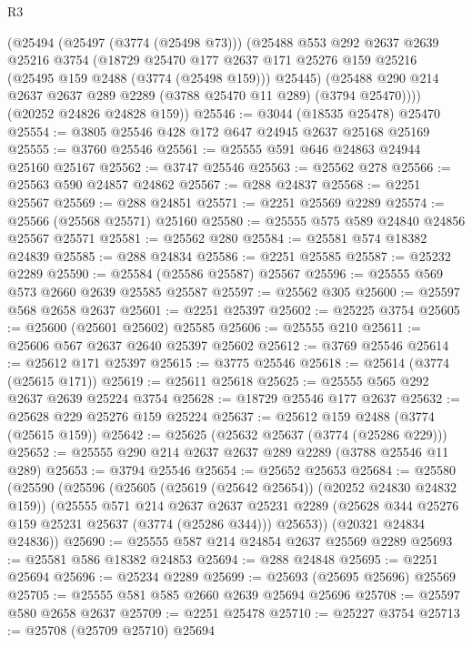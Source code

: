 \begin{lexlean}{R3}
\begin{coremodule}
      (@25494
        (@25497 (@3774 (@25498 @73)))
        (@25488
          @553
          @292
          @2637
          @2639
          @25216
          @3754
          (@18729
            @25470
            @177
            @2637
            @171
            @25276
            @159
            @25216
            (@25495 @159 @2488 (@3774 (@25498 @159)))
            @25445)
          (@25488 @290 @214 @2637 @2637 @289 @2289 (@3788 @25470 @11 @289) (@3794 @25470))))
      (@20252 @24826 @24828 @159))
@25546 := @3044 (@18535 @25478) @25470
@25554 := @3805 @25546 @428 @172 @647 @24945 @2637 @25168 @25169
@25555 := @3760 @25546
@25561 := @25555 @591 @646 @24863 @24944 @25160 @25167
@25562 := @3747 @25546
@25563 := @25562 @278
@25566 := @25563 @590 @24857 @24862
@25567 := @288 @24837
@25568 := @2251 @25567
@25569 := @288 @24851
@25571 := @2251 @25569 @2289
@25574 := @25566 (@25568 @25571) @25160
@25580 := @25555 @575 @589 @24840 @24856 @25567 @25571
@25581 := @25562 @280
@25584 := @25581 @574 @18382 @24839
@25585 := @288 @24834
@25586 := @2251 @25585
@25587 := @25232 @2289
@25590 := @25584 (@25586 @25587) @25567
@25596 := @25555 @569 @573 @2660 @2639 @25585 @25587
@25597 := @25562 @305
@25600 := @25597 @568 @2658 @2637
@25601 := @2251 @25397
@25602 := @25225 @3754
@25605 := @25600 (@25601 @25602) @25585
@25606 := @25555 @210
@25611 := @25606 @567 @2637 @2640 @25397 @25602
@25612 := @3769 @25546
@25614 := @25612 @171 @25397
@25615 := @3775 @25546
@25618 := @25614 (@3774 (@25615 @171))
@25619 := @25611 @25618
@25625 := @25555 @565 @292 @2637 @2639 @25224 @3754
@25628 := @18729 @25546 @177 @2637
@25632 := @25628 @229 @25276 @159 @25224
@25637 := @25612 @159 @2488 (@3774 (@25615 @159))
@25642 := @25625 (@25632 @25637 (@3774 (@25286 @229)))
@25652 := @25555 @290 @214 @2637 @2637 @289 @2289 (@3788 @25546 @11 @289)
@25653 := @3794 @25546
@25654 := @25652 @25653
@25684 := @25580
    (@25590
      (@25596
        (@25605 (@25619 (@25642 @25654)) (@20252 @24830 @24832 @159))
        (@25555
          @571
          @214
          @2637
          @2637
          @25231
          @2289
          (@25628 @344 @25276 @159 @25231 @25637 (@3774 (@25286 @344)))
          @25653))
      (@20321 @24834 @24836))
@25690 := @25555 @587 @214 @24854 @2637 @25569 @2289
@25693 := @25581 @586 @18382 @24853
@25694 := @288 @24848
@25695 := @2251 @25694
@25696 := @25234 @2289
@25699 := @25693 (@25695 @25696) @25569
@25705 := @25555 @581 @585 @2660 @2639 @25694 @25696
@25708 := @25597 @580 @2658 @2637
@25709 := @2251 @25478
@25710 := @25227 @3754
@25713 := @25708 (@25709 @25710) @25694

\end{coremodule}
\end{lexlean}
